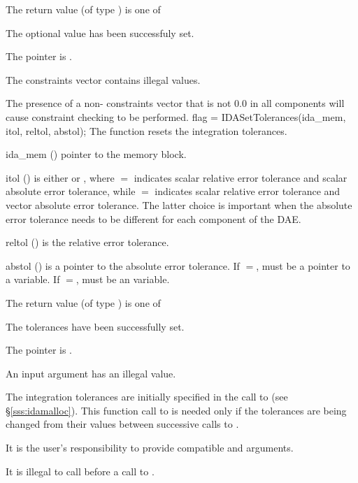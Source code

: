 {
  The return value  (of type ) is one of
  \begin{args}
  \item[\Id{IDA\_SUCCESS}] 
    The optional value has been successfuly set.
  \item[\Id{IDA\_MEM\_NULL}]
    The  pointer is .
  \item[\Id{IDA\_ILL\_INPUT}]
    The constraints vector contains illegal values.
  \end{args}
}
{
  The presence of a non- constraints vector that is not $0.0$ in
  all components will cause constraint checking to be performed.
}
{
flag = IDASetTolerances(ida\_mem, itol, reltol, abstol);
}
{
  The function  resets the integration tolerances.
}
{
  \begin{args}
  \item[ida\_mem] ()
    pointer to the {\ida} memory block.
  \item[itol] () 
    is either  or , where $=$ indicates
    scalar relative error tolerance and scalar absolute error tolerance, while
    $=$ indicates scalar relative error tolerance and vector
    absolute error tolerance.  The latter choice is important when the absolute
    error tolerance needs to be different for each component of the DAE. 
  \item[reltol] ()
    is the relative error tolerance.
  \item[abstol] ()
    is a pointer to the absolute error tolerance. If $=$, 
    must be a pointer to a  variable. If $=$, 
    must be an  variable.
  \end{args}
}
{
  The return value  (of type ) is one of
  \begin{args}
  \item[\Id{IDA\_SUCCESS}] 
    The tolerances have been successfully set.
  \item[\Id{IDA\_MEM\_NULL}]
    The  pointer is .
  \item[\Id{IDA\_ILL\_INPUT}]
    An input argument has an illegal value.
  \end{args}
}
{
  The integration tolerances are initially specified in the call
  to  (see \S\ref{sss:idamalloc}). This function call
  to  is needed only if the tolerances are being changed
  from their values between successive calls to .

  {\warn} It is the user's responsibility to provide compatible  and
   arguments.

  {\warn} It is illegal to call  before a call to .

}
